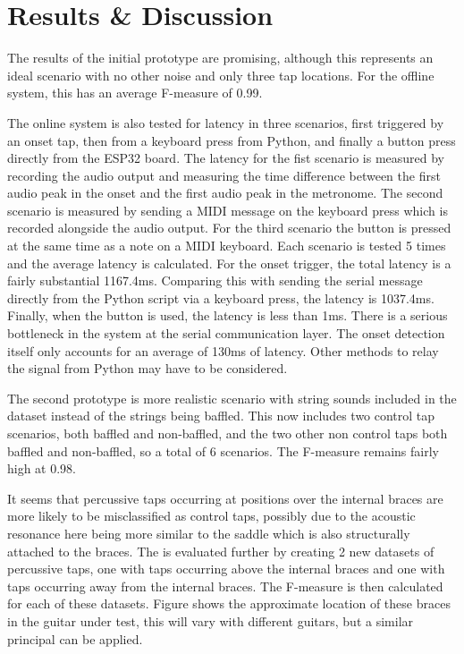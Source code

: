 \documentclass[conference]{IEEEtran}
\begin{document}
\section{Results \& Discussion}

The results of the initial prototype are promising, although this represents an ideal scenario with no other noise and only three tap locations. For the offline system, this has an
average F-measure of 0.99.

The online system is also tested for latency in three scenarios, first triggered by an onset tap, then from a keyboard press from Python, and finally a button press directly from the
ESP32 board. The latency for the fist scenario is measured by recording the audio output and measuring the time difference between the first audio peak in the onset and the first audio peak in the metronome. The second 
scenario is measured by sending a MIDI message on the keyboard press which is recorded alongside the audio output. For the third scenario the button is pressed at the same time as a note on a MIDI keyboard. 
Each scenario is tested 5 times and the average latency is calculated. For the onset trigger, the total latency is a fairly substantial 1167.4ms. Comparing this with sending
the serial message directly from the Python script via a keyboard press, the latency is 1037.4ms. Finally, when the button is used, the latency is less than 1ms.
There is a serious bottleneck in the system at the serial communication layer. The onset detection itself only accounts for an average of 130ms of latency. Other methods to relay the signal
from Python may have to be considered.

The second prototype is more realistic scenario with string sounds included in the dataset instead of the strings being baffled. This now includes two control tap scenarios, both baffled and non-baffled, and the two other non control taps both baffled and non-baffled,
so a total of 6 scenarios. The F-measure remains fairly high at 0.98.

It seems that percussive taps occurring at positions over the internal braces are more likely to be misclassified as control taps, possibly due to the acoustic resonance here being more similar to the saddle which is also structurally attached to
the braces. The is evaluated further by creating 2 new datasets of percussive taps, one with taps occurring above the internal braces and one with taps occurring away from the internal braces. The F-measure is then calculated for each of these datasets.
Figure shows the approximate location of these braces in the guitar under test, this will vary with different guitars, but a similar principal can be applied. 
\end{document}
